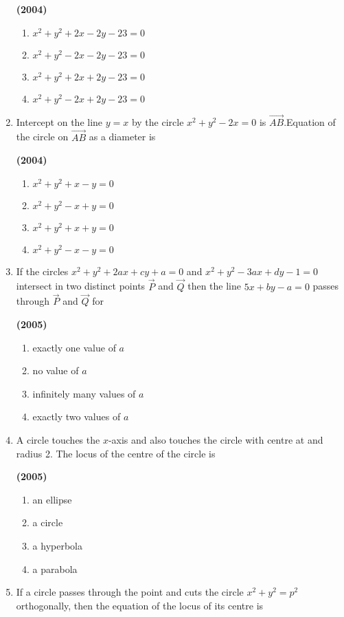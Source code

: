 \documentclass[journal,12pt,twocolumn]{IEEEtran}
\theoremstyle{remark}
\begin{document}
\begin{enumerate}[start=6]
\hfill{\textbf{(2004)}}

\begin{enumerate}[label=(\alph*)]
\item $x^2+y^2+2x-2y-23=0$
\item $x^2+y^2-2x-2y-23=0$
\item $x^2+y^2+2x+2y-23=0$
\item $x^2+y^2-2x+2y-23=0$
\end{enumerate}
\item Intercept on the line $y=x$ by the circle $x^2+y^2-2x=0$ is $\vec{AB}$.Equation of the circle on $\vec{AB}$ as a diameter is 

\hfill{\textbf{(2004)}}

\begin{enumerate}[label=(\alph*)]
\item $x^2+y^2+x-y=0$
\item $x^2+y^2-x+y=0$
\item $x^2+y^2+x+y=0$
\item $x^2+y^2-x-y=0$
\end{enumerate}
\item If the circles $x^2+y^2+2ax+cy+a=0$ and $x^2+y^2-3ax+dy-1=0$ intersect in two distinct points $\vec{P}$ and $\vec{Q}$ then the line $5x+by-a=0$ passes through $\vec{P}$ and $\vec{Q}$ for

\hfill{\textbf{(2005)}}

\begin{enumerate}[label=(\alph*)]
\item exactly one value of $a$
\item no value of $a$
\item infinitely many values of $a$
\item exactly two values of $a$
\end{enumerate}
\item A circle touches the $x$-axis and also touches the circle with centre at  and radius 2. The locus of the centre of the circle is

\hfill{\textbf{(2005)}}

\begin{multicols}{2}
\begin{enumerate}[label=(\alph*)]
\item an ellipse
\item a circle 
\item a hyperbola
\item a parabola
\end{enumerate}
\end{multicols}
\item If a circle passes through the point  and cuts the circle $x^2+y^2=p^2$ orthogonally, then the equation of the locus of its centre is 


\end{enumerate}
\end{document}
